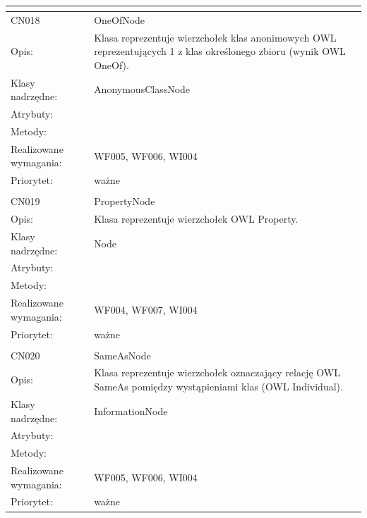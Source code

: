 \documentclass[a4paper,10pt]{article}
\begin{document}
\begin{center}
\begin{longtable}{|m{3cm}|m{9cm}|}
\multicolumn{2}{c}{} \\
 \hline

CN018 & OneOfNode \\ \hline
Opis: & Klasa reprezentuje wierzchołek klas anonimowych OWL reprezentujących 1 z klas określonego zbioru (wynik OWL OneOf).    \\ \hline
Klasy nadrzędne: & AnonymousClassNode     \\ \hline
Atrybuty: & %
 \\ \hline
Metody: & %
  \\ \hline
Realizowane wymagania: & WF005, WF006, WI004 \\ \hline
Priorytet: & ważne  \\ \hline

\multicolumn{2}{c}{} \\
 \hline

CN019 & PropertyNode \\ \hline
Opis: & Klasa reprezentuje wierzchołek OWL Property.    \\ \hline
Klasy nadrzędne: & Node     \\ \hline
Atrybuty: & %
 \\ \hline
Metody: & %
  \\ \hline
Realizowane wymagania: & WF004, WF007, WI004 \\ \hline
Priorytet: & ważne  \\ \hline

\multicolumn{2}{c}{} \\
 \hline

CN020 & SameAsNode \\ \hline
Opis: & Klasa reprezentuje wierzchołek oznaczający relację OWL SameAs pomiędzy wystąpieniami klas (OWL Individual).    \\ \hline
Klasy nadrzędne: & InformationNode     \\ \hline
Atrybuty: & %
 \\ \hline
Metody: & %
  \\ \hline
Realizowane wymagania: & WF005, WF006, WI004 \\ \hline
Priorytet: & ważne  \\ \hline


\end{longtable}
\end{center}
\end{document}
